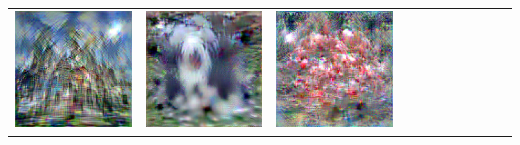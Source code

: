 {\begin{center}
\begin{tabular}{ccccccccccc}
    \includegraphics[align=c,width=\coverwidth\linewidth]{figures/cover/imagenet/church_0.pdf} &
    \includegraphics[align=c,width=\coverwidth\linewidth]{figures/cover/imagenet/english_sheepdog_0.pdf} &
    \includegraphics[align=c,width=\coverwidth\linewidth]{figures/cover/imagenet/flamingo_0.pdf} &

\end{tabular}
\end{center}}
